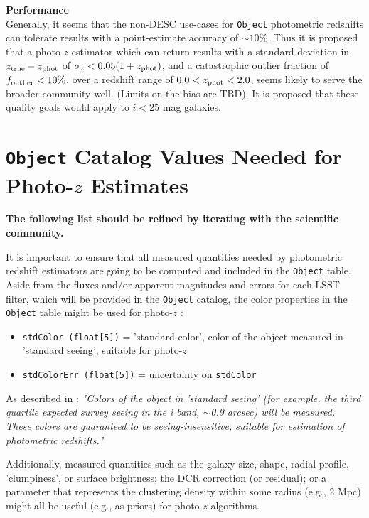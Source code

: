 \documentclass[DM,lsstdraft,toc]{lsstdoc}
\begin{document}
{\bf Performance}\\
Generally, it seems that the non-DESC use-cases for {\tt Object} photometric redshifts can tolerate results with a point-estimate accuracy of $\sim10\%$.
Thus it is proposed that a photo-$z$ estimator which can return results with a standard deviation in $z_{\rm true}-z_{\rm phot}$ of $\sigma_z < 0.05(1+z_{\rm phot})$, and a catastrophic outlier fraction of $f_{\rm outlier} < 10\%$, over a redshift range of $0.0 < z_{\rm phot} < 2.0$, seems likely to serve the broader community well.
(Limits on the bias are TBD).
It is proposed that these quality goals would apply to $i<25$ mag galaxies.





\clearpage
\section{{\tt Object} Catalog Values Needed for Photo-$z$ Estimates}\label{sec:objvals}

{\bf The following list should be refined by iterating with the scientific community.}

It is important to ensure that all measured quantities needed by photometric redshift estimators are going to be computed and included in the {\tt Object} table. 
Aside from the fluxes and/or apparent magnitudes and errors for each LSST filter, which will be provided in the {\tt Object} catalog, the color properties in the {\tt Object} table might be used for photo-$z$ : 

\begin{itemize}%
\item \texttt{stdColor (float[5])} = 'standard color', color of the object measured in 'standard seeing', suitable for photo-$z$
\item \texttt{stdColorErr (float[5])} = uncertainty on \texttt{stdColor}
\end{itemize}

As described in : {\it "Colors of the object in 'standard seeing' (for example, the third quartile expected survey seeing in the i band, $\sim$0.9 arcsec) will be measured. These colors are guaranteed to be seeing-insensitive, suitable for estimation of photometric redshifts."}

Additionally, measured quantities such as the galaxy size, shape, radial profile, 'clumpiness', or surface brightness; the DCR correction (or residual); or a parameter that represents the clustering density within some radius (e.g., 2 Mpc) might all be useful (e.g., as priors) for photo-$z$ algorithms. 
\end{document}
